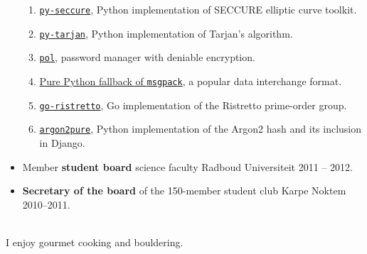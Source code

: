 \documentclass{article}
\newcommand\partitle[1]{\vskip20pt\par\noindent{\textsf{\textbf{#1}}}}
\begin{document}
\begin{itemize}
\begin{enumerate}
            \item \href{https://github.com/bwesterb/py-seccure}{\texttt{py-seccure}}, Python implementation of SECCURE elliptic curve toolkit.
            \item \href{https://github.com/bwesterb/py-tarjan}{\texttt{py-tarjan}}, Python implementation of Tarjan's algorithm.
            \item \href{https://github.com/bwesterb/pol}{\texttt{pol}}, password manager with deniable encryption.
            \item \href{https://github.com/msgpack/msgpack-python/pull/42}{Pure Python fallback of \texttt{msgpack}}, a popular data interchange format.
            \item \href{https://github.com/bwesterb/go-ristretto}{\texttt{go-ristretto}}, Go implementation of the Ristretto prime-order group.
            \item \href{https://github.com/bwesterb/argon2pure}{\texttt{argon2pure}}, Python implementation of the Argon2 hash and its inclusion
                    in Django.
        \end{enumerate}
    \item Member \textbf{student board} science faculty Radboud Universiteit
        2011 -- 2012.
    \item \textbf{Secretary of the board} of the 150-member student
        club Karpe Noktem 2010--2011.
\end{itemize}

\partitle{Personal}\\
I enjoy gourmet cooking and bouldering.
\end{document}
